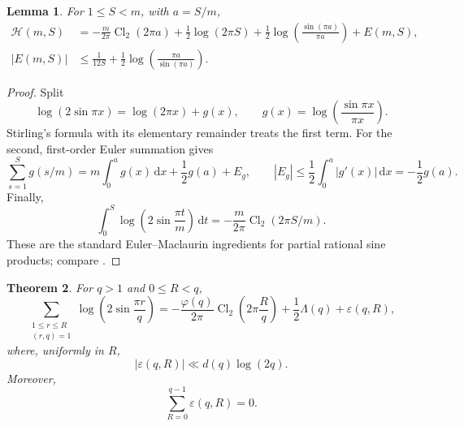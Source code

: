 \documentclass[11pt]{amsart}
\numberwithin{equation}{section}
\newtheorem{theorem}{Theorem}[section]
\newtheorem{lemma}[theorem]{Lemma}
\theoremstyle{definition}
\theoremstyle{remark}
\newcommand{\eps}{\varepsilon}
\newcommand{\dd}{\,\mathrm d}
\begin{document}
\begin{lemma}\label{lem:partial-sine}
For \(1\leq S<m\), with \(a=S/m\),
\begin{align}
 \mathcal H(m,S)
 &=-\frac{m}{2\pi}\operatorname{Cl}_2(2\pi a)
 +\frac12\log(2\pi S)
 +\frac12\log\!\left(\frac{\sin(\pi a)}{\pi a}\right)
 +E(m,S),\label{eq:partial-sine}\\
 |E(m,S)|
 &\leq\frac1{12S}
 +\frac12\log\!\left(\frac{\pi a}{\sin(\pi a)}\right).
 \label{eq:partial-sine-error}
\end{align}
\end{lemma}

\begin{proof}
Split
\[
 \log(2\sin\pi x)=\log(2\pi x)
 +g(x),\qquad g(x)=\log\!\left(\frac{\sin\pi x}{\pi x}\right).
\]
Stirling's formula with its elementary remainder treats the first term.
For the second, first-order Euler summation gives
\[
 \sum_{s=1}^{S}g(s/m)
 =m\int_0^ag(x)\dd x+\frac12g(a)+E_g,
 \qquad |E_g|\leq\frac12\int_0^a|g'(x)|\dd x=-\frac12g(a).
\]
Finally,
\[
 \int_0^S\log\!\left(2\sin\frac{\pi t}{m}\right)\dd t
 =-\frac{m}{2\pi}\operatorname{Cl}_2(2\pi S/m).
\]
These are the standard Euler--Maclaurin ingredients for partial rational
sine products; compare \cite{OSullivan2016}.
\end{proof}

\begin{theorem}\label{thm:Clausen}
For \(q>1\) and \(0\leq R<q\),
\begin{equation}\label{eq:Clausen}
 \sum_{\substack{1\leq r\leq R\\(r,q)=1}}
 \log\!\left(2\sin\frac{\pi r}{q}\right)
 =-\frac{\varphi(q)}{2\pi}
 \operatorname{Cl}_2\!\left(2\pi\frac Rq\right)
 +\frac12\Lambda(q)+\eps(q,R),
\end{equation}
where, uniformly in \(R\),
\begin{equation}\label{eq:epsilon-bound}
 |\eps(q,R)|\ll d(q)\log(2q).
\end{equation}
Moreover,
\begin{equation}\label{eq:epsilon-mean}
 \sum_{R=0}^{q-1}\eps(q,R)=0.
\end{equation}
\end{theorem}
\end{document}
